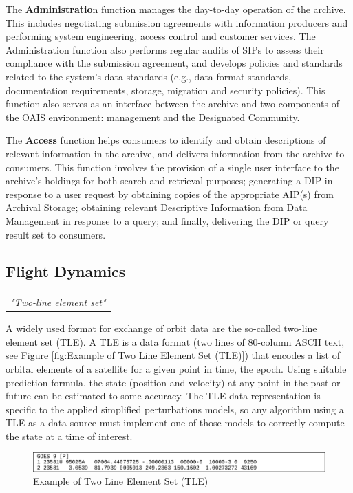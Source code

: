 The \textbf{Administratio}n function manages the day-to-day operation of the archive. This includes negotiating submission agreements with information producers and performing system engineering, access control and customer services. The Administration function also performs regular audits of SIPs to assess their compliance with the submission agreement, and develops policies and standards related to the system's data standards (e.g., data format standards, documentation requirements, storage, migration and security policies). This function also serves as an interface between the archive and two components of the OAIS environment: management and the Designated Community.

The \textbf{Access} function helps consumers to identify and obtain descriptions of relevant information in the archive, and delivers information from the archive to consumers. This function involves the provision of a single user interface to the archive's holdings for both search and retrieval purposes; generating a DIP in response to a user request by obtaining copies of the appropriate AIP(s) from Archival Storage; obtaining relevant Descriptive Information from Data Management in response to a query; and finally, delivering the DIP or query result set to consumers.

\subsection{Flight Dynamics}

\begin{tabular}{l}
\textit{"Two-line element set" \cite{wiki-TLE}} \\
\end{tabular}

A widely used format for exchange of orbit data are the so-called two-line element set (TLE). A TLE is a data format (two lines of 80-column ASCII text, see Figure \ref{fig:Example of Two Line Element Set (TLE)}) that encodes a list of orbital elements of a satellite for a given point in time, the epoch. Using suitable prediction formula, the state (position and velocity) at any point in the past or future can be estimated to some accuracy. The TLE data representation is specific to the applied simplified perturbations models, so any algorithm using a TLE as a data source must implement one of those models to correctly compute the state at a time of interest.

\begin{figure}[h]
\centering\includegraphics[scale=0.35]{fig/example_of_tle}
\caption{Example of Two Line Element Set (TLE)}
\label{fig:Example of Two Line Element Set}
\end{figure}


